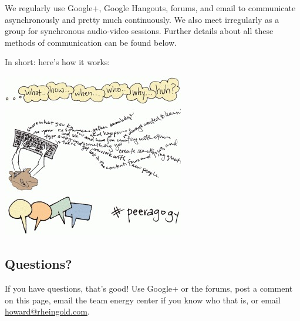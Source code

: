 We regularly use Google+, Google Hangouts, forums, and email to
communicate asynchronously and pretty much continuously. We also meet
irregularly as a group for synchronous audio-video sessions. Further
details about all these methods of communication can be found below.

In short: here's how it works:


\begin{center}
\includegraphics{../pictures/questions.jpg} \\
\includegraphics{../pictures/create_content.jpg} \\
\includegraphics{../pictures/communicate.jpg} \\
\end{center}

\subsection{Questions?}

If you have questions, that's good! Use Google+ or the forums, post a
comment on this page, email the team energy center if you know who that
is, or email \href{mailto:howard@rheingold.com}{howard@rheingold.com}.
